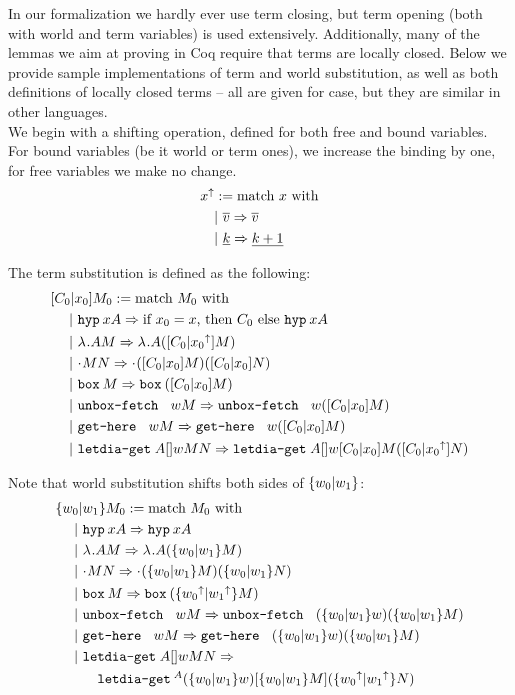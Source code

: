 In our formalization we hardly ever use term closing, but term opening (both with world and term variables) is used extensively. Additionally, many of the lemmas we aim at proving in Coq require that terms are locally closed. Below we provide sample implementations of
term and world substitution, as well as both definitions of locally closed terms -- all are given for \langHyb{} case, but they are similar in other languages.\\

We begin with a shifting operation, defined for both free and bound variables. For bound variables (be it world or term ones), we increase the binding by one, for free variables we make no change.\\

\begin{align*}
&\mbox{${x}^{\uparrow}$} := \mbox{$\text{match }{x}\text{ with}$}\\
&~~~|~ \overline{v} => \overline{v}\\
&~~~|~ \underline{k} => \underline{k+1}\\
\end{align*}

The term substitution is defined as the following:
\begin{align*}
&\substt{C_0}{x_0}{M_0} := \match{M_0} \\
&~~~~|~ \hyp x A => \ifthenelse{x_0=x}{C_0}{\hyp x A} \\
&~~~~|~ \lamb A M => \lamb A (\substt{C_0}{\shift{x_0}}{M}) \\
&~~~~|~ \appl M N => \appl {(\substt{C_0}{x_0}{M})} {(\substt{C_0}{x_0}{N})}\\
&~~~~|~ \bboxb {M} => \bboxb {(\substt{C_0}{x_0}{M})} \\
&~~~~|~ \unboxfetch w M => \unboxfetch w {(\substt{C_0}{x_0}{M})}\\
&~~~~|~ \gethere w M => \gethere w {(\substt{C_0}{x_0}{M})}\\
&~~~~|~ \letdiagetb A w M N => \letdiagetb A w {\substt{C_0}{x_0}{M}} {(\substt{C_0}{\shift{x_0}}{N})}
\end{align*}

Note that world substitution shifts both sides of $\mbox{$ \{w_0 | w_1 \} $}$:
\begin{align*}
&\substw{w_0}{w_1}{M_0} := \match{M_0} \\
&~~~~|~ \hyp x A => \hyp x A\\
&~~~~|~ \lamb A M => \lamb A (\substw{w_0}{w_1}{M}) \\
&~~~~|~ \appl M N => \appl {(\substw{w_0}{w_1}{M})} {(\substw{w_0}{w_1}{N})}\\
&~~~~|~ \bboxb {M} => \bboxb {(\substw{\shift{w_0}}{\shift{w_1}}{M})} \\
&~~~~|~ \unboxfetch w M => \unboxfetch {(\substw{w_0}{w_1}{w})} {(\substw{w_0}{w_1}{M})}\\
&~~~~|~ \gethere w M => \gethere {(\substw{w_0}{w_1}{w})} {(\substw{w_0}{w_1}{M})}\\
&~~~~|~ \letdiagetb A w M N => \\
&~~~~~~~~~\letdiagetb A {(\substw{w_0}{w_1}{w})} {\substw{w_0}{w_1}{M}} {(\substw{\shift{w_0}}{\shift{w_1}}{N})}
\end{align*}

